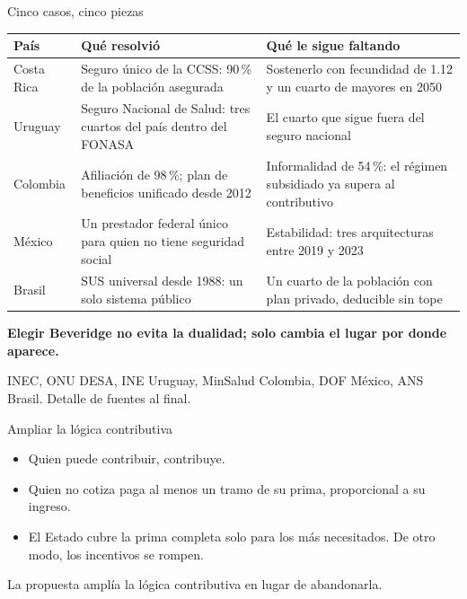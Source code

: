 \documentclass[aspectratio=169,11pt]{beamer}
\newcommand{\destacar}[1]{%
  \vspace{0.5em}%
  \begin{center}%
    \colorbox{banda}{\parbox{0.92\textwidth}{\centering\vspace{0.3em}\textbf{#1}\vspace{0.3em}}}%
  \end{center}%
}
\newcommand{\cierre}[1]{\vspace{0.5em}\par{#1}}
\newcommand{\pie}[1]{\vfill{\scriptsize\textcolor{grisfino}{#1}}}
\begin{document}
\begin{frame}{Cinco casos, cinco piezas}
  \begin{center}\footnotesize
  \begin{tabular}{@{}p{2.0cm}>{\raggedright\arraybackslash}p{5.5cm}>{\raggedright\arraybackslash}p{5.5cm}@{}}
    \rowcolor{banda}
    \textbf{País} & \textbf{Qué resolvió} & \textbf{Qué le sigue faltando} \\
    \midrule
    Costa Rica & Seguro único de la CCSS: 90\,\% de la población asegurada & Sostenerlo con fecundidad de 1.12 y un cuarto de mayores en 2050 \\[0.15em]
    Uruguay    & Seguro Nacional de Salud: tres cuartos del país dentro del FONASA & El cuarto que sigue fuera del seguro nacional \\[0.15em]
    Colombia   & Afiliación de 98\,\%; plan de beneficios unificado desde 2012 & Informalidad de 54\,\%: el régimen subsidiado ya supera al contributivo \\[0.15em]
    México     & Un prestador federal único para quien no tiene seguridad social & Estabilidad: tres arquitecturas entre 2019 y 2023 \\[0.15em]
    Brasil     & SUS universal desde 1988: un solo sistema público & Un cuarto de la población con plan privado, deducible sin tope \\
    \bottomrule
  \end{tabular}
  \end{center}
  \destacar{Elegir Beveridge no evita la dualidad; solo cambia el lugar por donde aparece.}
  \pie{INEC, ONU DESA, INE Uruguay, MinSalud Colombia, DOF México, ANS Brasil. Detalle de fuentes al final.}
\end{frame}


\begin{frame}{Ampliar la lógica contributiva}
  \begin{itemize}
    \item Quien puede contribuir, contribuye.
    \item Quien no cotiza paga al menos un tramo de su prima, proporcional a su ingreso.
    \item El Estado cubre la prima completa solo para los más necesitados. De otro modo, los incentivos se rompen.
  \end{itemize}
  \cierre{La propuesta amplía la lógica contributiva en lugar de abandonarla.}
\end{frame}
\end{document}
